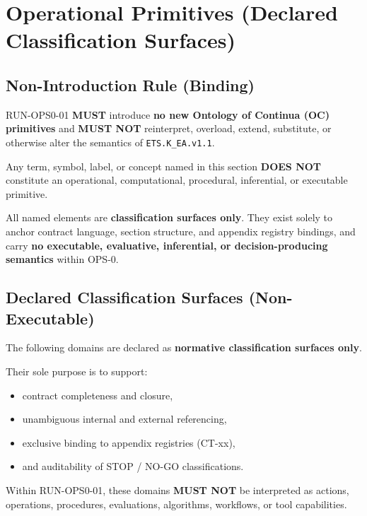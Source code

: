 ﻿\section{Operational Primitives (Declared Classification Surfaces)}

\subsection{Non-Introduction Rule (Binding)}
RUN-OPS0-01 \textbf{MUST} introduce \textbf{no new Ontology of Continua (OC) primitives}
and \textbf{MUST NOT} reinterpret, overload, extend, substitute,
or otherwise alter the semantics of \texttt{ETS.K\_EA.v1.1}.

Any term, symbol, label, or concept named in this section
\textbf{DOES NOT} constitute an operational, computational,
procedural, inferential, or executable primitive.

All named elements are \textbf{classification surfaces only}.
They exist solely to anchor contract language,
section structure, and appendix registry bindings,
and carry \textbf{no executable, evaluative,
inferential, or decision-producing semantics}
within OPS-0.

\subsection{Declared Classification Surfaces (Non-Executable)}
The following domains are declared as
\textbf{normative classification surfaces only}.

Their sole purpose is to support:
\begin{itemize}
  \item contract completeness and closure,
  \item unambiguous internal and external referencing,
  \item exclusive binding to appendix registries (CT-xx),
  \item and auditability of STOP / NO-GO classifications.
\end{itemize}

Within RUN-OPS0-01, these domains
\textbf{MUST NOT} be interpreted as actions,
operations, procedures, evaluations,
algorithms, workflows, or tool capabilities.

